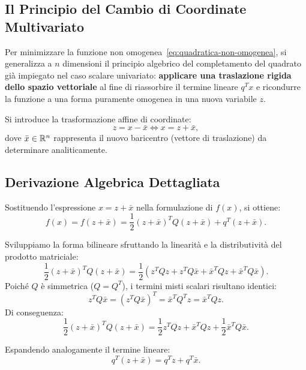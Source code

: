 \subsection{Il Principio del Cambio di Coordinate Multivariato}
Per minimizzare la funzione non omogenea~\eqref{eq:quadratica-non-omogenea}, si generalizza a $n$ dimensioni il principio algebrico del completamento del quadrato gi\`a impiegato nel caso scalare univariato: \textbf{applicare una traslazione rigida dello spazio vettoriale} al fine di riassorbire il termine lineare $q^T x$ e ricondurre la funzione a una forma puramente omogenea in una nuova variabile $z$.

Si introduce la trasformazione affine di coordinate:
\begin{equation}
    z = x - \bar{x} \iff x = z + \bar{x},
    \label{eq:cambio-coordinate-z}
\end{equation}
dove $\bar{x} \in \mathbb{R}^n$ rappresenta il nuovo baricentro (vettore di traslazione) da determinare analiticamente.

\subsection{Derivazione Algebrica Dettagliata}
Sostituendo l'espressione $x = z + \bar{x}$ nella formulazione di $f(x)$, si ottiene:
\begin{equation}
    f(x) = f(z + \bar{x}) = \frac{1}{2} (z + \bar{x})^T Q (z + \bar{x}) + q^T (z + \bar{x}).
\end{equation}

Sviluppiamo la forma bilineare sfruttando la linearit\`a e la distributivit\`a del prodotto matriciale:
\begin{equation}
    \frac{1}{2} (z + \bar{x})^T Q (z + \bar{x}) = \frac{1}{2} \left( z^T Q z + z^T Q \bar{x} + \bar{x}^T Q z + \bar{x}^T Q \bar{x} \right).
\end{equation}
Poich\'e $Q$ \`e simmetrica ($Q = Q^T$), i termini misti scalari risultano identici:
\begin{equation}
    z^T Q \bar{x} = (z^T Q \bar{x})^T = \bar{x}^T Q^T z = \bar{x}^T Q z.
\end{equation}
Di conseguenza:
\begin{equation}
    \frac{1}{2} (z + \bar{x})^T Q (z + \bar{x}) = \frac{1}{2} z^T Q z + \bar{x}^T Q z + \frac{1}{2} \bar{x}^T Q \bar{x}.
\end{equation}

Espandendo analogamente il termine lineare:
\begin{equation}
    q^T (z + \bar{x}) = q^T z + q^T \bar{x}.
\end{equation}

